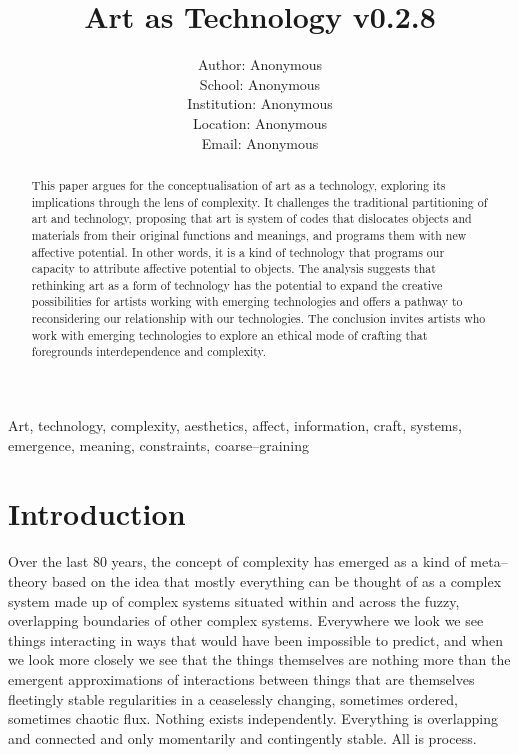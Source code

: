 \documentclass[letterpaper]{article}
\title{Art as Technology v0.2.8}
\author{Author: Anonymous\\
School: Anonymous\\
Institution: Anonymous\\
Location: Anonymous\\
Email: Anonymous\\
\newline
\newline
}
\begin{document}
 
\maketitle
\begin{abstract}

    This paper argues for the conceptualisation of art as a technology, exploring its implications through the lens of complexity. It challenges the traditional partitioning of art and technology, proposing that art is system of codes that dislocates objects and materials from their original functions and meanings, and programs them with new affective potential. In other words, it is a kind of technology that programs our capacity to attribute affective potential to objects. The analysis suggests that rethinking art as a form of technology has the potential to expand the creative possibilities for artists working with emerging technologies and offers a pathway to reconsidering our relationship with our technologies. The conclusion invites artists who work with emerging technologies to explore an ethical mode of crafting that foregrounds interdependence and complexity.

\end{abstract}


Art, technology, complexity, aesthetics, affect, information, craft, systems, emergence, meaning, constraints, coarse–graining

\section{Introduction}

    Over the last 80 years, the concept of complexity has emerged as a kind of meta–theory based on the idea that mostly everything can be thought of as a complex system made up of complex systems situated within and across the fuzzy, overlapping boundaries of other complex systems. Everywhere we look we see things interacting in ways that would have been impossible to predict, and when we look more closely we see that the things themselves are nothing more than the emergent approximations of interactions between things that are themselves fleetingly stable regularities in a ceaselessly changing, sometimes ordered, sometimes chaotic flux. Nothing exists independently. Everything is overlapping and connected and only momentarily and contingently stable. All is process.
    
\end{document}
